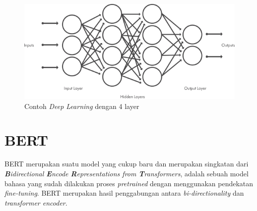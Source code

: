 \begin{figure}[ht]
    \centering
    \includegraphics[width=\textwidth]{gambar/deeplearning_layer.png}
    \caption{Contoh \textit{Deep Learning} dengan 4 layer \cite{mathwork_deeplearning}}
    \label{fig: deeplearning_layer}
\end{figure}




\section{BERT}
BERT merupakan suatu model yang cukup baru dan merupakan singkatan dari \textit{\textbf{B}idirectional \textbf{E}ncode \textbf{R}epresentations from \textbf{T}ransformers}, adalah sebuah model bahasa yang sudah dilakukan proses \textit{pretrained} dengan menggunakan pendekatan \textit{fine-tuning}. BERT merupakan hasil penggabungan antara \textit{bi-directionality} dan \textit{transformer encoder}. \cite{devlin2019bert}

